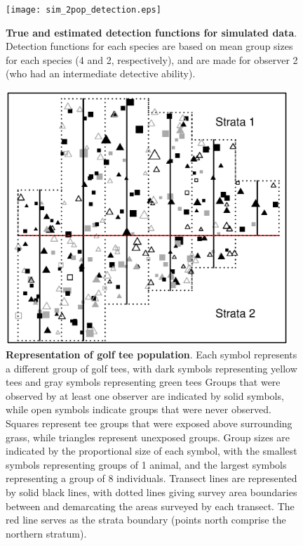 \documentclass[10pt]{article}
\begin{document}
\begin{figure}
\begin{center}
\texttt{[image: sim\_2pop\_detection.eps]}
\end{center}
\caption{{\bf True and estimated detection functions for simulated data}.  Detection functions for each species are based on mean group sizes for each species (4 and 2, respectively), and are made for observer 2 (who had an intermediate detective ability).}
\label{fig:sim_detection}
\end{figure}
\clearpage

\begin{figure}
\begin{center}
\includegraphics[width=0.95\textwidth]{golf_tee.eps}
\end{center}
\caption{{\bf Representation of golf tee population}. Each symbol represents a different group of golf tees, with dark symbols representing yellow tees and gray symbols representing green tees  Groups that were observed by at least one observer are indicated by solid symbols, while open symbols indicate groups that were never observed.  Squares represent tee groups that were exposed above surrounding grass, while triangles represent unexposed groups.
Group sizes are indicated by the proportional size of each symbol, with the smallest symbols representing groups of 1 animal, and the largest symbols representing a group of 8 individuals.  Transect lines are represented by solid black lines, with dotted lines giving survey area boundaries between and demarcating the areas surveyed by each transect.  The red line serves as the strata boundary (points north comprise the northern stratum).}
\label{fig:tee_landscape}
\end{figure}
\clearpage
\end{document}
